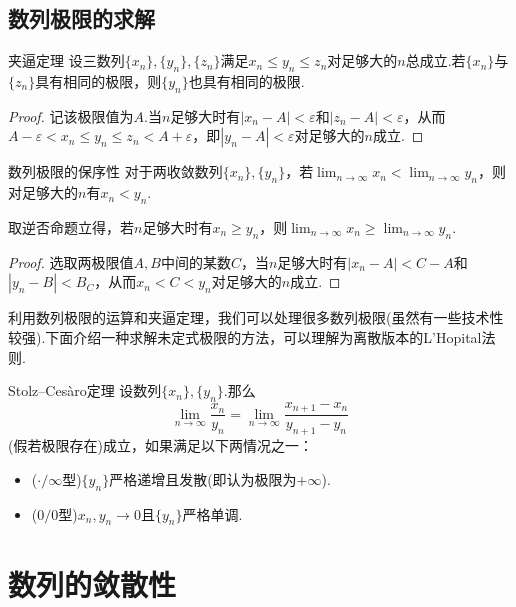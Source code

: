 \subsection{数列极限的求解}

\begin{theorem}{夹逼定理}
	设三数列$\{ x_n \},\{ y_n \},\{ z_n \}$满足$x_n \leq y_n \leq z_n$对足够大的$n$总成立.若$\{ x_n \}$与$\{ z_n \}$具有相同的极限，则$\{ y_n \}$也具有相同的极限.
\end{theorem}
\begin{proof}
	记该极限值为$A$.当$n$足够大时有$|x_n-A|<\varepsilon$和$|z_n-A|<\varepsilon$，从而$A-\varepsilon < x_n \leq y_n \leq z_n < A+\varepsilon$，即$|y_n-A|<\varepsilon$对足够大的$n$成立.
\end{proof}

\begin{theorem}{数列极限的保序性}
	对于两收敛数列$\{ x_n \},\{ y_n \}$，若$\lim_{n \to \infty} x_n < \lim_{n \to \infty} y_n$，则对足够大的$n$有$x_n<y_n$.
\end{theorem}
\begin{remark}
	取逆否命题立得，若$n$足够大时有$x_n \geq y_n$，则$\lim_{n \to \infty} x_n \geq \lim_{n \to \infty} y_n$.
\end{remark}
\begin{proof}
	选取两极限值$A,B$中间的某数$C$，当$n$足够大时有$|x_n-A|<C-A$和$|y_n-B|<B_C$，从而$x_n<C<y_n$对足够大的$n$成立.
\end{proof}

利用数列极限的运算和夹逼定理，我们可以处理很多数列极限(虽然有一些技术性较强).下面介绍一种求解未定式极限的方法，可以理解为离散版本的L'Hopital法则.

\begin{theorem}{Stolz–Cesàro定理}
	设数列$\{ x_n \},\{ y_n \}$.那么$$\lim_{n\to \infty} \frac{x_n}{y_n} = \lim_{n\to \infty} \frac{x_{n+1}-x_n}{y_{n+1}-y_n}$$(假若极限存在)成立，如果满足以下两情况之一：
	\begin{itemize}
		\item ($\cdot / \infty$型)$\{ y_n \}$严格递增且发散(即认为极限为$+\infty$).
		\item ($0/0$型)$x_n,y_n \to 0$且$\{ y_n \}$严格单调.
	\end{itemize}
\end{theorem}

\section{数列的敛散性}

